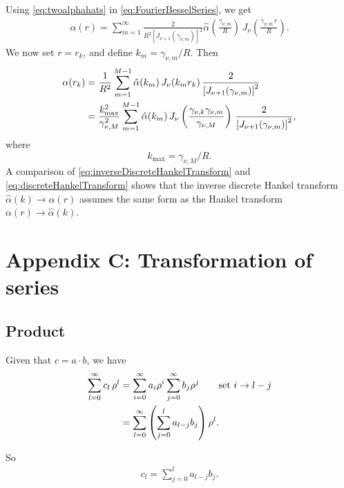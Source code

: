 \documentclass[preprint]{revtex4-1}
\numberwithin{equation}{subsection}
\numberwithin{table}{section}
\begin{document}
Using \eqref{eq:twoalphahats} in \eqref{eq:FourierBesselSeries},
we get
\begin{align*}
  \alpha(r)
=
\sum_{m = 1}^\infty
\frac{ 2 } { R^2 [J_{\nu + 1}(\gamma_{\nu, m})]^2 }
\hat\alpha
  \left(
    \frac{ \gamma_{\nu, m} } { R }
  \right) \,
J_\nu\left(
    \frac{ \gamma_{\nu, m} \, r } { R }
  \right).
\end{align*}
%
We now set $r = r_k$, and define $k_m = \gamma_{\nu, m}/R$.
Then
\begin{align}
  \alpha(r_k)
&=
  \frac{ 1 }{ R^2 }
  \sum_{m = 1}^{M - 1}
    \hat\alpha(k_m) \,
    J_\nu(k_m r_k) \,
    \frac{ 2 }
    { \left[
        J_{\nu+1}(\gamma_{\nu,m})
      \right]^2 }
\notag
\\
&=
  \frac{ k_{\max}^2 }
       { \gamma_{\nu, M}^2 }
  \sum_{m = 1}^{M - 1}
    \hat\alpha(k_m) \,
    J_\nu\left(
      \frac{ \gamma_{\nu, k} \gamma_{\nu, m} }
           { \gamma_{\nu, M} }
    \right) \,
    \frac{ 2 }
    { \left[
        J_{\nu + 1}(\gamma_{\nu, m})
      \right]^2 },
\label{eq:inverseDiscreteHankelTransform}
\end{align}
where
\[
  k_{\max} = \gamma_{\nu, M} / R.
\]
A comparison of \eqref{eq:inverseDiscreteHankelTransform}
and \eqref{eq:discreteHankelTransform}
shows that the inverse discrete Hankel transform
$\hat\alpha(k) \rightarrow \alpha(r)$
assumes the same form as the Hankel transform
$\alpha(r) \rightarrow \hat\alpha(k)$.



\section{Appendix C: Transformation of series}

\subsection{Product}

Given that $c = a \cdot b$, we have
\begin{align*}
  \sum_{l = 0}^{\infty} c_l \, \rho^l
  &=
  \sum_{i = 0}^{\infty} a_i \rho^i
  \sum_{j = 0}^{\infty} b_j \rho^j
  \qquad \mbox{set $i \rightarrow l - j$}
 \notag \\
  &=
  \sum_{l = 0}^{\infty}
  \left(
  \sum_{j = 0}^{l}
    a_{l-j} b_j \right) \rho^l.
\end{align*}

So
\begin{align}
  c_l = \sum_{j = 0}^{l} a_{l-j} b_j.
  \label{eq:product}
\end{align}
\end{document}
